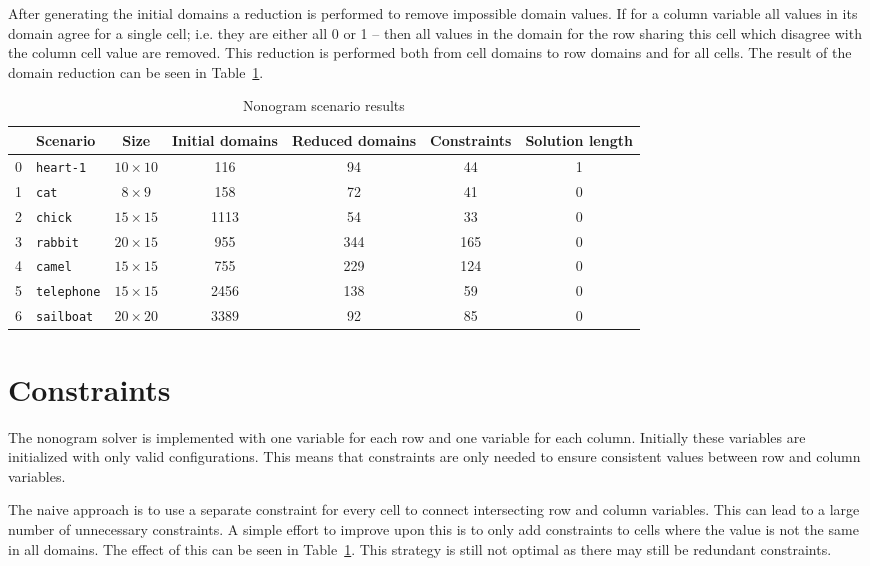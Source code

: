 After generating the initial domains a reduction is performed to remove impossible domain values. If for a column variable all values in its domain agree for a single cell; i.e. they are either all 0 or 1 -- then all values in the domain for the row sharing this cell which disagree with the column cell value are removed. This reduction is performed both from cell domains to row domains and for all cells. The result of the domain reduction can be seen in Table~\ref{table:nonoresults}.

\begin{table}
\centering
\begin{tabular}{rlccccc}
\toprule
& Scenario & Size & Initial domains & Reduced domains & Constraints & Solution length \\
\midrule
0 & \texttt{heart-1}   & $10 \times 10$ &  116 &  94 &  44 & 1 \\
1 & \texttt{cat}       & $ 8 \times  9$ &  158 &  72 &  41 & 0 \\
2 & \texttt{chick}     & $15 \times 15$ & 1113 &  54 &  33 & 0 \\
3 & \texttt{rabbit}    & $20 \times 15$ &  955 & 344 & 165 & 0 \\
4 & \texttt{camel}     & $15 \times 15$ &  755 & 229 & 124 & 0 \\
5 & \texttt{telephone} & $15 \times 15$ & 2456 & 138 &  59 & 0 \\
6 & \texttt{sailboat}  & $20 \times 20$ & 3389 &  92 &  85 & 0 \\
\bottomrule
\end{tabular}
\caption{Nonogram scenario results}
\label{table:nonoresults}
\end{table}

\section*{Constraints}

The nonogram solver is implemented with one variable for each row and one variable for each column. Initially these variables are initialized with only valid configurations. This means that constraints are only needed to ensure consistent values between row and column variables.

The naive approach is to use a separate constraint for every cell to connect intersecting row and column variables. This can lead to a large number of unnecessary constraints. A simple effort to improve upon this is to only add constraints to cells where the value is not the same in all domains. The effect of this can be seen in Table~\ref{table:nonoresults}. This strategy is still not optimal as there may still be redundant constraints.

